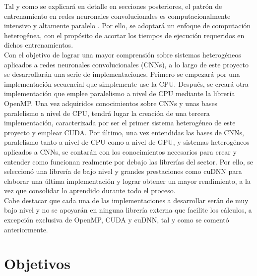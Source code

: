 Tal y como se explicará en detalle en secciones posteriores, el patrón de entrenamiento en redes neuronales convolucionales es computacionalmente intensivo y altamente paralelo \cite{Programming_Massively}. Por ello, se adoptará un enfoque de computación heterogénea, con el propósito de acortar los tiempos de ejecución requeridos en dichos entrenamientos. \\
Con el objetivo de lograr una mayor comprensión sobre sistemas heterogéneos aplicados a redes neuronales convolucionales (CNNs), a lo largo de este proyecto se desarrollarán una serie de implementaciones. Primero se empezará por una implementación secuencial que simplemente use la CPU. Después, se creará otra implementación que emplee paralelismo a nivel de CPU mediante la librería OpenMP. Una vez adquiridos conocimientos sobre CNNs y unas bases paralelismo a nivel de CPU, tendrá lugar la creación de una tercera implementación, caracterizada por ser el primer sistema heterogéneo de este proyecto y emplear CUDA. Por último, una vez entendidas las bases de CNNs, paralelismo tanto a nivel de CPU como a nivel de GPU, y sistemas heterogéneos aplicados a CNNs, se contarán con los conocimientos necesarios para crear y entender como funcionan realmente por debajo las librerías del sector. Por ello, se seleccionó una librería de bajo nivel y grandes prestaciones como cuDNN para elaborar una última implementación y lograr obtener un mayor rendimiento, a la vez que consolidar lo aprendido durante todo el proceso. \\
Cabe destacar que cada una de las implementaciones a desarrollar serán de muy bajo nivel y no se apoyarán en ninguna librería externa que facilite los cálculos, a excepción exclusiva de OpenMP, CUDA y cuDNN, tal y como se comentó anteriormente. 


\section{Objetivos}

